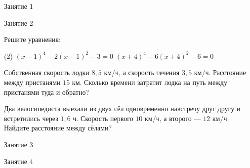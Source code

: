 
\begin{class}[number=1]
	\begin{listofex}
		\item Занятие 1
	\end{listofex}
\end{class}

\begin{class}[number=2]
	\begin{listofex}
		\item Занятие 2
	\end{listofex}
\end{class}

\begin{homework}[number=1]
	\begin{listofex}
		\item Решите уравнения:
		\begin{tasks}(2)
			\task \( (x-1)^4-2(x-1)^2-3=0 \)
			\task \( (x+4)^4-6(x+4)^2-6=0 \)
		\end{tasks}
		\item Собственная скорость лодки \( 8,5 \) км/ч, а скорость течения \( 3,5 \) км/ч. Расстояние между пристанями \( 15 \) км. Сколько времени затратит лодка на путь между пристанями туда и обратно?
		\item Два велосипедиста выехали из двух сёл одновременно навстречу друг другу и встретились через \( 1,6 \) ч. Скорость первого \( 10 \) км/ч, а второго --- \( 12 \) км/ч. Найдите расстояние между сёлами?
	\end{listofex}
\end{homework}

\begin{class}[number=3]
	\begin{listofex}
		\item Занятие 3 
	\end{listofex}
\end{class}

\begin{class}[number=4]
	\begin{listofex}
		\item Занятие 4
	\end{listofex}
\end{class}

